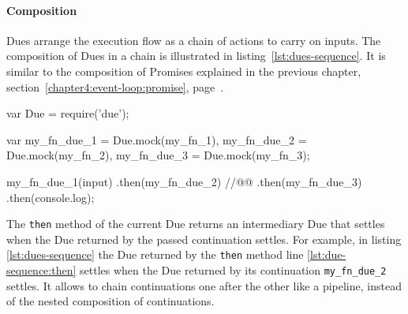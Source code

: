 

\vspace{\baselineskip}

\paragraph{Composition}

Dues arrange the execution flow as a chain of actions to carry on inputs.
The composition of Dues in a chain is illustrated in listing~\ref{lst:dues-sequence}.
It is similar to the composition of Promises explained in the previous chapter, section~\ref{chapter4:event-loop:promise}, page~\pageref{chapter4:event-loop:promise}.

\begin{code}[js, %
             caption={Dues are chained like Promises}, %
             label={lst:dues-sequence}] %
var Due = require('due');

var my_fn_due_1 = Due.mock(my_fn_1),
    my_fn_due_2 = Due.mock(my_fn_2),
    my_fn_due_3 = Due.mock(my_fn_3);

my_fn_due_1(input)
.then(my_fn_due_2) //@\label{lst:due-sequence:then}@
.then(my_fn_due_3)
.then(console.log);
\end{code}

The \texttt{then} method of the current Due returns an intermediary Due that settles when the Due returned by the passed continuation settles.
For example, in listing \ref{lst:dues-sequence} the Due returned by the \texttt{then} method line \ref{lst:due-sequence:then} settles when the Due returned by its continuation \texttt{my\_fn\_due\_2} settles.
It allows to chain continuations one after the other like a pipeline, instead of the nested composition of continuations.






